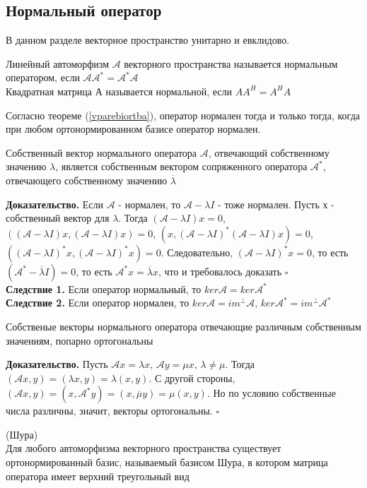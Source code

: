 \subsection{Нормальный оператор}
В данном разделе векторное пространство унитарно и евклидово.
\begin{defin}
Линейный автоморфизм $\mathcal A$ векторного пространства называется нормальным
оператором, если $\mathcal A\mathcal A^*=\mathcal A^*\mathcal A$\\
Квадратная матрица А называется нормальной, если $AA^H=A^HA$
\end{defin}
Согласно теореме (\ref{vparebiortba}), оператор нормален тогда и только тогда,
когда при любом ортонормированном базисе оператор нормален.
\begin{theor}
Собственный вектор нормального оператора $\mathcal A$, отвечающий собственному
значению $\lambda$, является собственным вектором сопряженного оператора
$\mathcal A^*$, отвечающего собственному значению $\overline{\lambda}$
\end{theor}
\textbf{Доказательство.} Если $\mathcal A$ - нормален, то $\mathcal A-\lambda I$
- тоже нормален. Пусть х - собственный вектор для $\lambda$. Тогда
$(\mathcal A-\lambda I)x=0$, $((\mathcal A-\lambda I)x,(\mathcal
A-\lambda I)x)=0$, $(x,(\mathcal A-\lambda I)^*(\mathcal A-\lambda I)x)=0$,
$((\mathcal A-\lambda I)^*x,(\mathcal
A-\lambda I)^*x)=0$. Следовательно, $(\mathcal A-\lambda I)^*x=0$, то есть 
$(\mathcal A^*-\overline{\lambda} I)=0$, то есть
$\mathcal A^*x=\overline{\lambda}x$, что и требовалось доказать $\square$\\
\textbf{Следствие 1.} Если оператор нормальный, то
$ker\mathcal A=ker\mathcal A^*$\\
\textbf{Следствие 2.} Если оператор нормален, то
$ker\mathcal A=im^\perp\mathcal A$, $ker\mathcal A^*=im^\perp\mathcal A^*$
\begin{theor}\label{sobvecpoparort}
Собственые векторы нормального оператора отвечающие различным собственным 
значениям, попарно ортогональны
\end{theor}
\textbf{Доказательство.} Пусть $\mathcal Ax=\lambda x$, $\mathcal Ay=\mu x$, 
$\lambda\ne\mu$. Тогда $(\mathcal Ax,y)=(\lambda x,y)=\lambda(x,y)$. С другой
стороны, $(\mathcal Ax,y)=(x,\mathcal
A^*y)=(x,\overline{\mu}y)=\mu(x,y)$. Но по условию собственные числа различны,
значит, векторы ортогональны. $\square$
\begin{theor}(Шура)\\
Для любого автоморфизма векторного пространства существует ортонормированный
базис, называемый базисом Шура, в котором матрица оператора имеет верхний 
треугольный вид
\end{theor}
